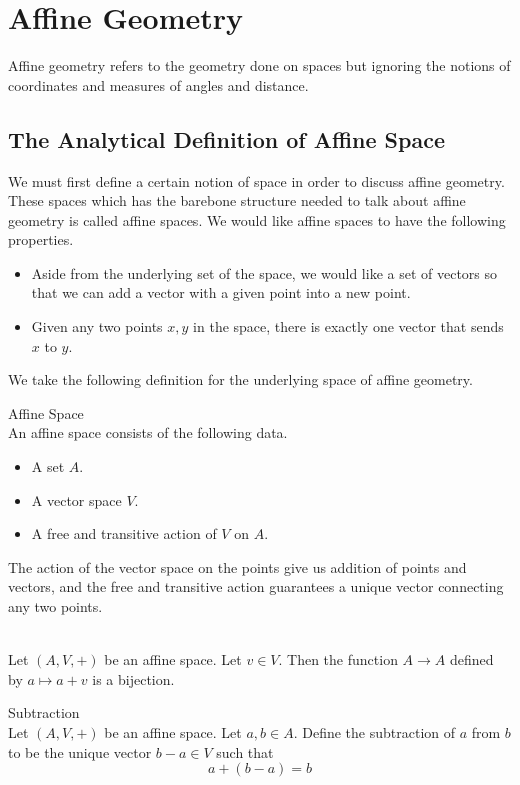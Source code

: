 \documentclass[a4paper]{article}
\begin{document}
\pagebreak
\section{Affine Geometry}
Affine geometry refers to the geometry done on spaces but ignoring the notions of coordinates and measures of angles and distance.

\subsection{The Analytical Definition of Affine Space}
We must first define a certain notion of space in order to discuss affine geometry. These spaces which has the barebone structure needed to talk about affine geometry is called affine spaces. We would like affine spaces to have the following properties. 

\begin{itemize}
\item Aside from the underlying set of the space, we would like a set of vectors so that we can add a vector with a given point into a new point. 
\item Given any two points $x,y$ in the space, there is exactly one vector that sends $x$ to $y$. 
\end{itemize}

We take the following definition for the underlying space of affine geometry. 

\begin{defn}{Affine Space}{}\\
An affine space consists of the following data. 
\begin{itemize}
\item A set $A$. 
\item A vector space $V$. 
\item A free and transitive action of $V$ on $A$. 
\end{itemize}
\end{defn}

The action of the vector space on the points give us addition of points and vectors, and the free and transitive action guarantees a unique vector connecting any two points. 

\begin{lmm}{}{}\\
Let $(A,V,+)$ be an affine space. Let $v\in V$. Then the function $A\to A$ defined by $a\mapsto a+v$ is a bijection. 
\end{lmm}

\begin{defn}{Subtraction}{}\\
Let $(A,V,+)$ be an affine space. Let $a,b\in A$. Define the subtraction of $a$ from $b$ to be the unique vector $b-a\in V$ such that $$a+(b-a)=b$$
\end{defn}
\end{document}
